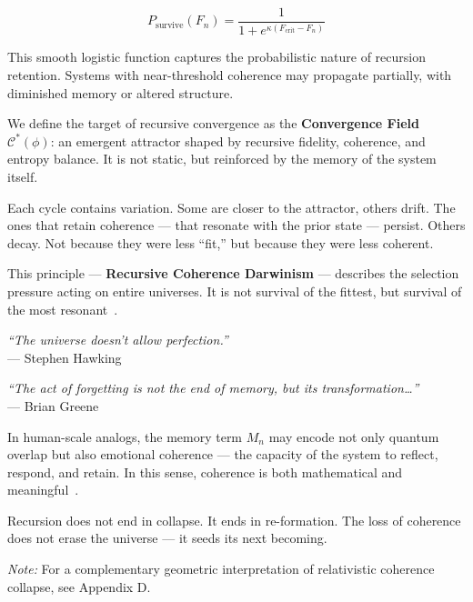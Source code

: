 \[
P_{\text{survive}}(F_n) = \frac{1}{1 + e^{\kappa (F_{\text{crit}} - F_n)}}
\]

This smooth logistic function captures the probabilistic nature of recursion retention. Systems with near-threshold coherence may propagate partially, with diminished memory or altered structure.

We define the target of recursive convergence as the \textbf{Convergence Field} \( \mathcal{C}^*(\phi) \): an emergent attractor shaped by recursive fidelity, coherence, and entropy balance. It is not static, but reinforced by the memory of the system itself.

Each cycle contains variation. Some are closer to the attractor, others drift. The ones that retain coherence --- that resonate with the prior state --- persist. Others decay. Not because they were less ``fit,'' but because they were less coherent.

This principle --- \textbf{Recursive Coherence Darwinism} --- describes the selection pressure acting on entire universes. It is not survival of the fittest, but survival of the most resonant~\cite{darwinism_cosmology_2018,tegmark_mathematical_2008}.

\vspace{1em}
\noindent
\textit{“The universe doesn’t allow perfection.”}~\cite{hawking_brief_1988} \\
\hfill --- Stephen Hawking

\vspace{1em}
\noindent
\textit{“The act of forgetting is not the end of memory, but its transformation…”}~\cite{greene_fabric_2004}
 \\
\hfill ---  Brian Greene

\vspace{2em}

In human-scale analogs, the memory term \( M_n \) may encode not only quantum overlap but also emotional coherence --- the capacity of the system to reflect, respond, and retain. In this sense, coherence is both mathematical and meaningful~\cite{penrose_emperors_1994,tononi_consciousness_2004}.

Recursion does not end in collapse. It ends in re-formation. The loss of coherence does not erase the universe --- it seeds its next becoming.

\noindent\textit{Note:} For a complementary geometric interpretation of relativistic coherence collapse, see Appendix D.


